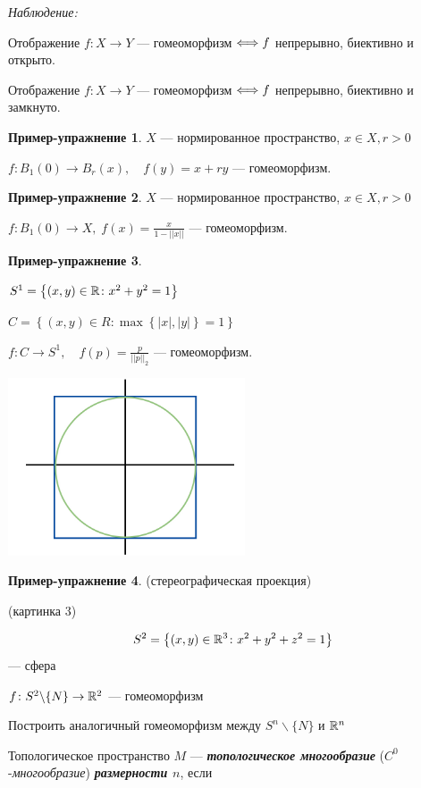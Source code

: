\documentclass[../../main.tex]{subfiles}
\begin{document}
\textit{Наблюдение:} 

Отображение $f\colon X \to Y$ — гомеоморфизм $\Longleftrightarrow f$ непрерывно, биективно и открыто.

Отображение $f\colon X \to Y$ — гомеоморфизм $\Longleftrightarrow f$   непрерывно, биективно и замкнуто.

\textbf{Пример-упражнение 1}. $X$ — нормированное пространство, $x \in X, r > 0$

$f \colon B_1(0) \to B_r(x), \quad f(y) = x + ry$ — гомеоморфизм.

\textbf{Пример-упражнение 2}. $X$ — нормированное пространство, $x \in X, r > 0$

$f \colon B_1(0) \to X,\; f(x) = \frac{x}{1 - ||x||}$ — гомеоморфизм.

\textbf{Пример-упражнение 3}. 

\begin{minipage}{0.6\linewidth}
$S^1 = \left\{ (x,y) \in \mathbb{R} \colon x^2 + y^2 = 1 \right\}$

$C = \left\{ (x, y) \in R \colon \max\left\{ |x|, |y| \right\} = 1 \right\}$

$f \colon C \to S^1, \quad f(p) = \frac{p}{||p||_2}$ — гомеоморфизм.
\end{minipage}
\hfill
\begin{minipage}{0.4\linewidth}
\includegraphics[width=7cm]{pictures/2.jpg}
\end{minipage}

\textbf{Пример-упражнение 4}. (стереографическая проекция)

(картинка 3)

$$S^2 = \left\{ (x,y) \in \mathbb{R}^3 \colon x^2 + y^2 + z^2 = 1 \right\} $$ — сфера

$f \colon S^2 \backslash\{N\} \to \mathbb{R}^2$ — гомеоморфизм


Построить аналогичный гомеоморфизм между $S^n \backslash \{N\}$ и $\mathbb{R}^n$

 Топологическое пространство $M$ — \textit{\textbf{топологическое многообразие}} ($C^0$-\textit{многообразие}) \textit{\textbf{размерности $n$}}, если
\end{document}
